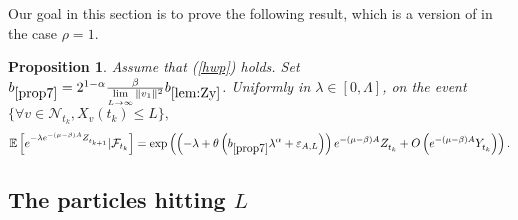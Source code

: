 \documentclass[11pt]{article}
\theoremstyle{plain}
\newtheorem{proposition}[lemma]{Proposition}
\newcommand\vep{\varepsilon}
\begin{document}
Our goal  in this section is to prove the following result, which is a version of  \cite[Proposition 7.1]{Maillard:2020aa} in the case $\rho=1$.
\begin{proposition}\label{prop7}
Assume that (\ref{hwp}) holds.  Set $b_{\ref{prop7}}= 2^{1-\alpha}\frac{\beta}{\lim\limits_{L\rightarrow\infty}\|v_1\|^2}b_{\ref{lem:Zy}}$. Uniformly in $\lambda\in[0,\Lambda]$, on the event $\{\forall v\in \mathcal{N}_{t_k}, X_v(t_k)\leqslant L\},$  
\begin{equation*}
\mathbb{E}\left[e^{-\lambda e^{-(\mu-\beta)A} Z^{}_{t_{k+1}}}|\mathcal{F}_{t_k}\right]=\exp\left(\left(-\lambda+\theta\left(b_{\ref{prop7}}\lambda^\alpha +\vep_{A,L}\right)\right)e^{-(\mu-\beta)A}Z^{}_{t_k}+O\left(e^{-(\mu-\beta)A}Y^{}_{t_k}\right)\right).
\end{equation*}

\end{proposition}



\subsection{The particles hitting $L$}
\end{document}
